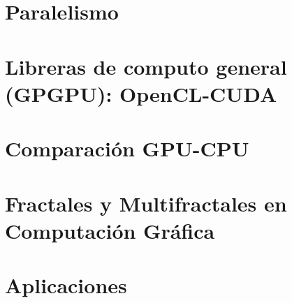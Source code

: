 \documentclass[spanish,a4paper,11pt,oneside,links]{report}
\begin{document}
\section{Paralelismo}
\section{Libreras de computo general (GPGPU): OpenCL-CUDA}
\section{Comparación GPU-CPU}
\section{Fractales y Multifractales en Computación Gráfica}
\section{Aplicaciones}





\end{document}

